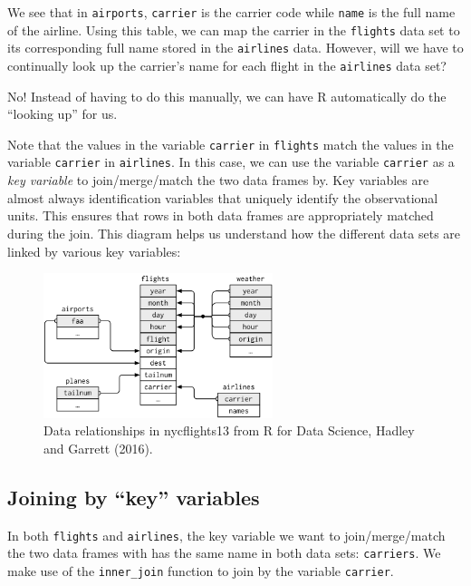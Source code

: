 \documentclass[
  letterpaper,
  DIV=11,
  numbers=noendperiod]{scrartcl}
\begin{document}
We see that in \texttt{airports}, \texttt{carrier} is the carrier code
while \texttt{name} is the full name of the airline. Using this table,
we can map the carrier in the \texttt{flights} data set to its
corresponding full name stored in the \texttt{airlines} data. However,
will we have to continually look up the carrier's name for each flight
in the \texttt{airlines} data set?

No! Instead of having to do this manually, we can have R automatically
do the ``looking up'' for us.

Note that the values in the variable \texttt{carrier} in
\texttt{flights} match the values in the variable \texttt{carrier} in
\texttt{airlines}. In this case, we can use the variable
\texttt{carrier} as a \emph{key variable} to join/merge/match the two
data frames by. Key variables are almost always identification variables
that uniquely identify the observational units. This ensures that rows
in both data frames are appropriately matched during the join. This
diagram helps us understand how the different data sets are linked by
various key variables:

\begin{figure}[H]

{\centering \includegraphics[width=2.64in,height=\textheight]{relational-nycflights.png}

}

\caption{Data relationships in nycflights13 from R for Data Science,
Hadley and Garrett (2016).}

\end{figure}%

\subsection{Joining by ``key''
variables}\label{joining-by-key-variables}

In both \texttt{flights} and \texttt{airlines}, the key variable we want
to join/merge/match the two data frames with has the same name in both
data sets: \texttt{carriers}. We make use of the \texttt{inner\_join}
function to join by the variable \texttt{carrier}.
\end{document}
